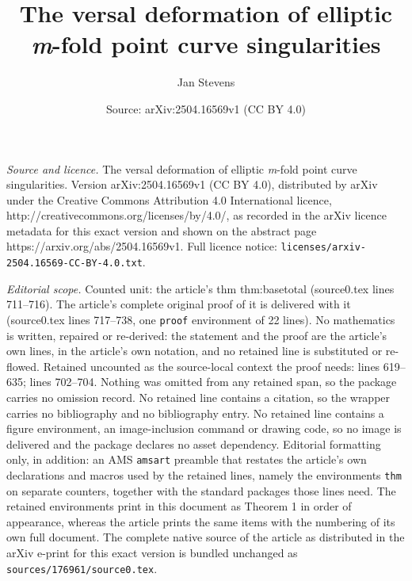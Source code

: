 \documentclass[10pt,a4paper]{amsart}
\title{The versal deformation of elliptic \textit{m}-fold point curve singularities}
\author{Jan Stevens}
\date{Source: arXiv:2504.16569v1 (CC BY 4.0)}
\begin{document}
\maketitle

\noindent\emph{Source and licence.} The versal deformation of elliptic \textit{m}-fold point curve singularities. Version arXiv:2504.16569v1 (CC BY 4.0), distributed by arXiv under the Creative Commons Attribution 4.0 International licence, http://creativecommons.org/licenses/by/4.0/, as recorded in the arXiv licence metadata for this exact version and shown on the abstract page https://arxiv.org/abs/2504.16569v1. Full licence notice: \texttt{licenses/arxiv-2504.16569-CC-BY-4.0.txt}.\par\smallskip

\noindent\textit{Editorial scope.} Counted unit: the article's thm thm:basetotal (source0.tex lines 711--716). The article's complete original proof of it is delivered with it (source0.tex lines 717--738, one \texttt{proof} environment of 22 lines). No mathematics is written, repaired or re-derived: the statement and the proof are the article's own lines, in the article's own notation, and no retained line is substituted or re-flowed.  Retained uncounted as the source-local context the proof needs: lines 619--635; lines 702--704.  Nothing was omitted from any retained span, so the package carries no omission record.  No retained line contains a citation, so the wrapper carries no bibliography and no bibliography entry.  No retained line contains a figure environment, an image-inclusion command or drawing code, so no image is delivered and the package declares no asset dependency.  Editorial formatting only, in addition: an AMS \texttt{amsart} preamble that restates the article's own declarations and macros used by the retained lines, namely the environments \texttt{thm} on separate counters, together with the standard packages those lines need.  The retained environments print in this document as Theorem 1 in order of appearance, whereas the article prints the same items with the numbering of its own full document.  The complete native source of the article as distributed in the arXiv e-print for this exact version is bundled unchanged as \texttt{sources/176961/source0.tex}.
\end{document}

